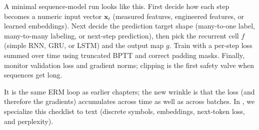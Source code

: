 \begin{tcolorbox}[summarybox, title={From sequence data to a next-step model (a minimal checklist)}]
A minimal sequence\hyp{}model run looks like this. First decide how each step becomes a numeric input vector \(\mathbf{x}_t\) (measured features, engineered features, or learned embeddings). Next decide the prediction target shape (many\hyp{}to\hyp{}one label, many\hyp{}to\hyp{}many labeling, or next\hyp{}step prediction), then pick the recurrent cell \(f\) (simple RNN, GRU, or LSTM) and the output map \(g\). Train with a per\hyp{}step loss summed over time using truncated BPTT and correct padding masks. Finally, monitor validation loss and gradient norms; clipping is the first safety valve when sequences get long.
\par\smallskip
It is the same ERM loop as earlier chapters; the new wrinkle is that the loss (and therefore the gradients) accumulates across time as well as across batches. In , we specialize this checklist to text (discrete symbols, embeddings, next\hyp{}token loss, and perplexity).
\end{tcolorbox}

